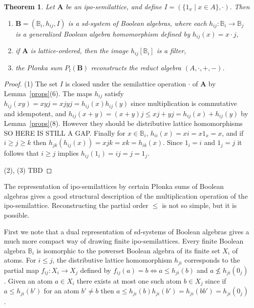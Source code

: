 \documentclass[12pt]{amsart}
\newtheorem{theorem}{Theorem}%
\newcommand{\m}{\mathbf} %
\begin{document}
\begin{theorem}\label{Bsystem}
Let $\m A$ be an ipo-semilattice, and define $I=(\{1_x\mid x\in A\},\cdot)$.
Then
\begin{enumerate}
\item $\m B=(\mathbb B_i,h_{ij},I)$ is a sd-system of Boolean algebras, where each $h_{ij}:\mathbb B_i\to \mathbb B_j$ is a generalized Boolean algebra homomorphism
defined by $h_{ij}(x)=x\cdot j$,
\item if $\m A$ is lattice-ordered, then the image $h_{ij}[\mathbb B_i]$ is a filter,
\item the P\l onka sum $P_\text{\l}(\m B)$ reconstructs the reduct algebra $(A,\cdot,+,-)$.
\end{enumerate}
\end{theorem}
\begin{proof} (1) The set $I$ is closed under the semilattice operation $\cdot$ of $\m A$ by Lemma~\ref{props}(6). The maps $h_{ij}$ satisfy
$h_{ij}(xy)=xyj=xjyj=h_{ij}(x)h_{ij}(y)$ since multiplication is commutative and idempotent,
and $h_{ij}(x+y)=(x+y)j\le xj+yj=h_{ij}(x)+h_{ij}(y)$ by Lemma~\ref{props}(8). However they should be distributive lattice homomorphisms SO HERE IS STILL A GAP. Finally for $x\in\mathbb B_i$, $h_{ii}(x)=xi=x1_x=x$, and if $i\ge j\ge k$ then $h_{jk}(h_{ij}(x))=xjk=xk=h_{ik}(x)$. Since
 $1_i=i$ and $1_j=j$ it follows that $i\ge j$ implies $h_{ij}(1_i)=ij=j=1_j$.

(2), (3) TBD
\end{proof}

The representation of ipo-semilattices by certain P\l onka sums of Boolean algebras gives a good structural description of the multiplication operation of the ipo-semilattice. Reconstructing the partial order $\le$ is not so simple, but it is possible.

First we note that a dual representation of sd-systems of Boolean algebras gives a much more compact way of drawing finite ipo-semilattices. Every finite Boolean algebra $\mathbb B_i$ is isomorphic to the powerset Boolean algebra of its finite set $X_i$ of atoms. For $i\le j$, the distributive lattice homomorphism $h_{ji}$ corresponds to the partial map $f_{ij}:X_i\to X_j$
defined by $f_{ij}(a)=b\iff a\le h_{ji}(b)$ and $a\nleq h_{ji}(0_j)$. Given an atom $a\in X_i$ there
exists at most one such atom $b\in X_j$ since if $a\le h_{ji}(b')$ for an atom $b'\ne b$ then
$a\le h_{ji}(b)h_{ji}(b')=h_{ji}(bb')=h_{ji}(0_j)$.
\end{document}
